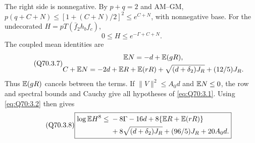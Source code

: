 The right side is nonnegative. By \(p+q=\allowbreak 2\) and AM--GM,
\(p(q+C+N)\le\allowbreak [1+(C+N)/2]^2\le\allowbreak  e^{C+N}\), with nonnegative base.
For the undecorated \(H=\allowbreak pT(\bar f_2h_bf_c)\),
\begin{equation}\tag{Q70.3.6}\label{eq:Q70:3.6}
0\le H\le e^{-\Gamma+C+N}.
\end{equation}
The coupled mean identities are
\begin{equation}\tag{Q70.3.7}\label{eq:Q70:3.7}
\begin{gathered}
\mathbb E N=-d+\mathbb E(gR),\\
C+\mathbb E N=-2d+\mathbb E R+\mathbb E(rR)
                +\sqrt{(d+\delta_2)J_R}+(12/5)J_R.
\end{gathered}
\end{equation}
Thus \(\mathbb E(gR)\) cancels between the terms.
If \(\|V\|^2\le\allowbreak  A_0d\) and \(\mathbb E N\le\allowbreak 0\), the row and spectral
bounds and Cauchy give all hypotheses of \eqref{eq:Q70:3.1}.
Using \eqref{eq:Q70:3.2} then gives
\begin{equation}\tag{Q70.3.8}\label{eq:Q70:3.8}
\boxed{\begin{aligned}
\log\mathbb E H^8\le{}&-8\Gamma-16d+8\{\mathbb E R+\mathbb E(rR)\}\\
 &+8\sqrt{(d+\delta_2)J_R}+(96/5)J_R+20A_0d.
\end{aligned}}
\end{equation}

